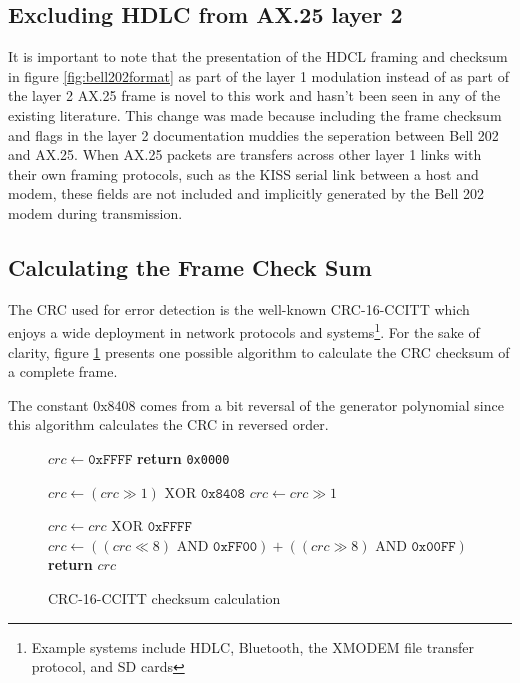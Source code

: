 \subsection{Excluding HDLC from AX.25 layer 2}

It is important to note that the presentation of the HDCL framing
and checksum
in figure \ref{fig:bell202format} as part of the layer 1 modulation 
instead of as part of the layer 2 AX.25 frame is 
novel to this work and hasn't been seen in any of the existing literature.
This change was made because including the frame checksum and flags
in the layer 2 documentation muddies the seperation between Bell 202 
and AX.25. When AX.25 packets are transfers across other layer 1 
links with their own framing protocols, 
such as the KISS serial link between a host and modem,
these fields are not included and implicitly generated by the
Bell 202 modem during transmission. 

\subsection{Calculating the Frame Check Sum}

The CRC used for error detection is the well-known CRC-16-CCITT which
enjoys a wide deployment in network protocols and 
systems\footnote{Example systems include HDLC, Bluetooth, the XMODEM file 
transfer protocol, and SD cards}.
For the sake of clarity, figure \ref{fig:crcccittcode} 
presents one possible algorithm to
calculate the CRC checksum of a complete frame.

The constant 0x8408 comes from a bit reversal of the generator polynomial
since this algorithm calculates the CRC in reversed order.

\begin{figure}
	\begin{algorithmic}[1]
		\State $crc \gets \texttt{0xFFFF}$
			\State \textbf{return} \texttt{0x0000}
		\EndIf

		\ForAll{$byte \gets frame[i], i \overset{\Delta}{=} [0,frame\_length)$}
		\State $crc \gets (crc \gg 1) \textrm{ XOR } \texttt{0x8408}$
		\Else
			\State $crc \gets crc \gg 1$
		\EndIf
		\EndFor
		\EndFor

		\State $crc \gets crc \textrm{ XOR } \texttt{0xFFFF}$
		\State $crc \gets ((crc \ll 8) \textrm{ AND } \texttt{0xFF00}) + ((crc \gg 8) \textrm{ AND } \texttt{0x00FF})$
		\State \textbf{return} $crc$
		\EndFunction
	\end{algorithmic}

	\caption{CRC-16-CCITT checksum calculation}
	\label{fig:crcccittcode}
\end{figure}

